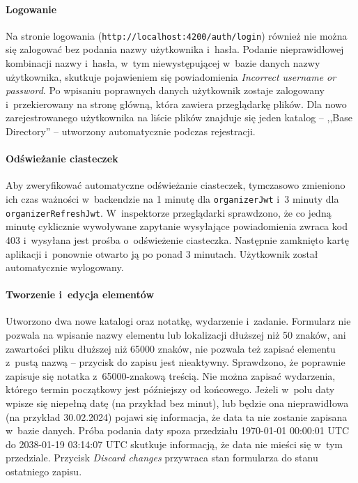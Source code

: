 \documentclass[a4paper,twoside,12pt]{book}
\newcommand{\obcy}[1]{\emph{#1}}
\newcommand{\english}[1]{{\selectlanguage{british}\obcy{#1}}}
\begin{document}
\paragraph{Logowanie}
Na stronie logowania (\texttt{http://localhost:4200/auth/login}) również nie można się zalogować bez podania nazwy użytkownika i~hasła. Podanie nieprawidłowej kombinacji nazwy i~hasła, w~tym niewystępującej w~bazie danych nazwy użytkownika, skutkuje pojawieniem się powiadomienia \english{Incorrect username or password}. Po wpisaniu poprawnych danych użytkownik zostaje zalogowany i~przekierowany na stronę główną, która zawiera przeglądarkę plików. Dla nowo zarejestrowanego użytkownika na liście plików znajduje się jeden katalog -- ,,Base Directory'' -- utworzony automatycznie podczas rejestracji.

\paragraph{Odświeżanie ciasteczek}
Aby zweryfikować automatyczne odświeżanie ciasteczek, tymczasowo zmieniono ich czas ważności w~backendzie na 1 minutę dla \texttt{organizerJwt} i~3 minuty dla \texttt{organizerRefreshJwt}. W~inspektorze przeglądarki sprawdzono, że co jedną minutę cyklicznie wywoływane zapytanie wysyłające powiadomienia zwraca kod 403 i~wysyłana jest prośba o~odświeżenie ciasteczka. Następnie zamknięto kartę aplikacji i~ponownie otwarto ją po ponad 3 minutach. Użytkownik został automatycznie wylogowany.

\paragraph{Tworzenie i~edycja elementów}
Utworzono dwa nowe katalogi oraz notatkę, wydarzenie i~zadanie. Formularz nie pozwala na wpisanie nazwy elementu lub lokalizacji dłuższej niż 50 znaków, ani zawartości pliku dłuższej niż 65000 znaków, nie pozwala też zapisać elementu z~pustą nazwą -- przycisk do zapisu jest nieaktywny. Sprawdzono, że poprawnie zapisuje się notatka z~65000-znakową treścią. Nie można zapisać wydarzenia, którego termin początkowy jest późniejszy od końcowego. Jeżeli w~polu daty wpisze się niepełną datę (na przykład bez minut), lub będzie ona nieprawidłowa (na przykład 30.02.2024) pojawi się informacja, że data ta nie zostanie zapisana w~bazie danych. Próba podania daty spoza przedziału 1970-01-01 00:00:01 UTC do 2038-01-19 03:14:07 UTC skutkuje informacją, że data nie mieści się w~tym przedziale. Przycisk \english{Discard changes} przywraca stan formularza do stanu ostatniego zapisu.
\end{document}

